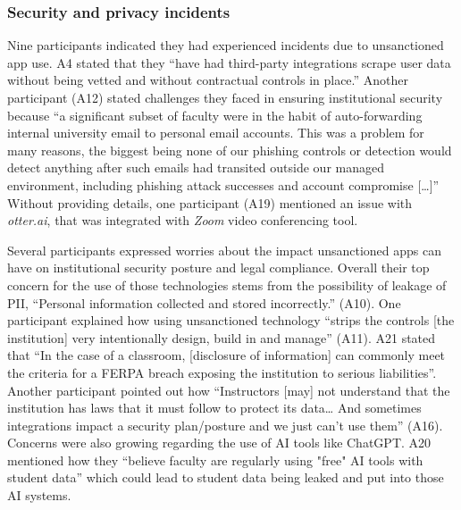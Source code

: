 \subsubsection{Security and privacy incidents}
\label{admin_sp_incidents}
Nine participants indicated they had experienced \SP incidents due to unsanctioned app use. A4 stated that they ``have had third-party integrations scrape user data without being vetted and without contractual controls in place.'' Another participant (A12) stated challenges they faced in ensuring institutional security because ``a significant subset of faculty were in the habit of auto-forwarding internal university email to personal email accounts. This was a problem for many reasons, the biggest being none of our phishing controls or detection would detect anything after such emails had transited outside our managed environment, including phishing attack successes and account compromise [\dots]'' Without providing details, one participant (A19) mentioned an issue with \textit{otter.ai},\cite{OtterAI} that was integrated with \textit{Zoom} video conferencing tool.

Several participants expressed worries about the impact unsanctioned apps can have on institutional security posture and legal compliance. Overall their top concern for the use of those technologies stems from the possibility of leakage of PII, ``Personal information collected and stored incorrectly.'' (A10). One participant explained how using unsanctioned technology ``strips the controls [the institution] very intentionally design, build in and manage'' (A11).  A21 stated that ``In the case of a classroom, [disclosure of information] can commonly meet the criteria for a FERPA breach exposing the institution to serious liabilities''.
Another participant pointed out how ``Instructors [may] not understand that the institution has laws that it must follow to protect its data… And sometimes integrations impact a security plan/posture and we just can't use them'' (A16). Concerns were also growing regarding the use of AI tools like ChatGPT. A20 mentioned how they ``believe faculty are regularly using "free" AI tools with student data'' which could lead to student data being leaked and put into those AI systems.



